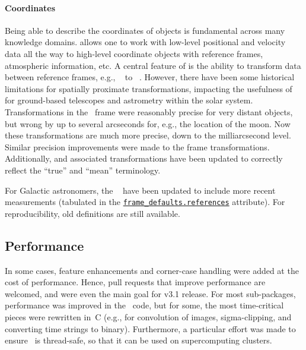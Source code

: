 \documentclass[modern]{aastex631}
\begin{document}
\paragraph{Coordinates}

Being able to describe the coordinates of objects is
fundamental across many knowledge domains. \astropycoordinates allows one to
work with low-level positional and velocity data all the way to high-level
coordinate objects with reference frames, atmospheric information, etc. A
central feature of \astropycoordinates is the ability to transform data between
reference frames, e.g., \astropyICRS\ \citep{ICRS:1997} to \astropyGalacticLSR\
\citep{GalacticLSR:2010}. However, there have been some historical limitations
for spatially proximate transformations, impacting the usefulness of
\astropycoordinates for ground-based telescopes and astrometry within the
solar system. Transformations in the \astropyAltAz\ frame were reasonably
precise for very distant objects, but wrong by up to several arcseconds for,
e.g., the location of the moon. Now these transformations are much more precise,
down to the milliarcsecond level. Similar precision improvements were made to
the
frame transformations. Additionally,
and associated transformations have been updated to correctly reflect the ``true''
and ``mean'' terminology.

For Galactic astronomers, the \astropyGalactocentric\
have been updated to include more recent measurements (tabulated in the
\href{https://docs.astropy.org/en/stable/api/astropy.coordinates.galactocentric_frame_defaults.html#astropy.coordinates.galactocentric_frame_defaults.references}{\texttt{frame\_defaults.references}}
attribute). For reproducibility, old definitions are still available.


\subsection{Performance} \label{sec:core-features-performance}

In some cases, feature enhancements and corner-case handling were added
at the cost of performance.
Hence, \github pull requests that improve performance are welcomed, and were even the
main goal for v3.1 release. For most sub-packages, performance was
improved in the \python\ code, but for some, the most time-critical pieces were
rewritten in~C (e.g., for convolution of images, sigma-clipping, and converting
time strings to binary). Furthermore, a particular effort was made to ensure
\astropypkg\ is thread-safe, so that it can be used on supercomputing clusters.
\end{document}
